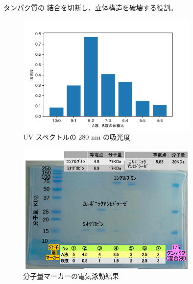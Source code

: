 \documentclass[a4paper]{ltjsarticle}
\begin{document}
タンパク質の  結合を切断し、立体構造を破壊する役割。



\begin{figure}[p]
    \begin{center}
        \includegraphics[width=0.8\textwidth]{1.pdf}
        \caption{UV スペクトルの 280 \si{nm} の吸光度}
        \label{fig:uv}
    \end{center}
\end{figure}

\begin{figure}[p]
    \begin{center}
        \includegraphics[width=0.8\textwidth]{result.png}
        \caption{分子量マーカーの電気泳動結果}
        \label{fig:result}
    \end{center}
\end{figure}
\end{document}
